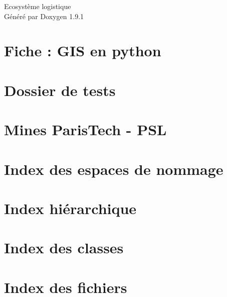 \let\mypdfximage\pdfximage\def\pdfximage{\immediate\mypdfximage}\documentclass[twoside]{book}
\newcommand{\+}{\discretionary{\mbox{\scriptsize$\hookleftarrow$}}{}{}}
\newcommand{\clearemptydoublepage}{%
  \newpage{\pagestyle{empty}\cleardoublepage}%
}
\begin{document}
\raggedbottom

\hypersetup{pageanchor=false,
             bookmarksnumbered=true,
             pdfencoding=unicode
            }
\begin{titlepage}
\vspace*{7cm}
\begin{center}%
{\Large Ecosystème logistique }\\
\vspace*{1cm}
{\large Généré par Doxygen 1.9.1}\\
\end{center}
\end{titlepage}
\clearemptydoublepage
{}
\tableofcontents
\clearemptydoublepage
{}
\hypersetup{pageanchor=true}

\chapter{Fiche \+: GIS en python}
\label{md_essais_gis_fiche_gis}

\chapter{Dossier de tests}
\label{md_essais__r_e_a_d_m_e}

\chapter{Mines Paris\+Tech -\/ PSL}
\label{md__r_e_a_d_m_e}

\chapter{Index des espaces de nommage}

\chapter{Index hiérarchique}

\chapter{Index des classes}

\chapter{Index des fichiers}

\end{document}
